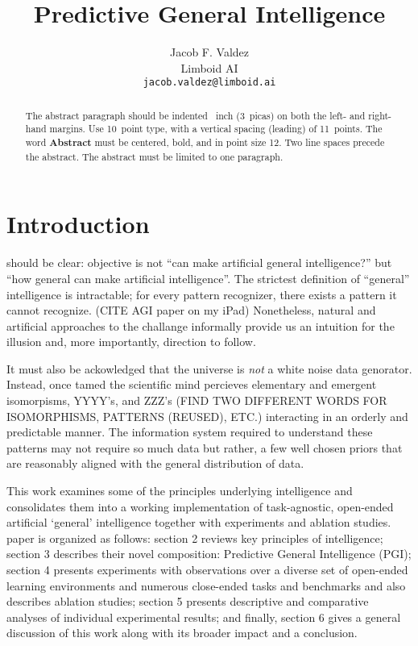\documentclass{article}
\title{Predictive General Intelligence}
\author{%
  Jacob F. Valdez \\
  Limboid AI \\
  \texttt{jacob.valdez@limboid.ai}
}
\begin{document}
\maketitle

\begin{abstract}
  The abstract paragraph should be indented ~inch (3~picas) on
  both the left- and right-hand margins. Use 10~point type, with a vertical
  spacing (leading) of 11~points.  The word \textbf{Abstract} must be centered,
  bold, and in point size 12. Two line spaces precede the abstract. The abstract
  must be limited to one paragraph.
\end{abstract}

\section{Introduction}

\I should be clear: \my objective is not ``can \I make artificial general intelligence?'' but ``how general can \I make artificial intelligence''. The strictest definition of ``general'' intelligence is intractable; for every pattern recognizer, there exists a pattern it cannot recognize. (CITE AGI paper on my iPad) Nonetheless, natural and artificial approaches to the challange informally provide us an intuition for the illusion and, more importantly, direction to follow.

It must also be ackowledged that the universe is \textit{not} a white noise data genorator. Instead, once tamed the scientific mind percieves elementary and emergent isomorpisms, YYYY's, and ZZZ's (FIND TWO DIFFERENT WORDS FOR ISOMORPHISMS, PATTERNS (REUSED), ETC.) interacting in an orderly and predictable manner. The information system required to understand these patterns may not require so much data but rather, a few well chosen priors that are reasonably aligned with the general distribution of data.
    
This work examines some of the principles underlying intelligence and consolidates them into a working implementation of task-agnostic, open-ended artificial `general' intelligence together with experiments and ablation studies. \My paper is organized as follows: section 2 reviews key principles of intelligence; section 3 describes their novel composition: Predictive General Intelligence (PGI); section 4 presents experiments with observations over a diverse set of open-ended learning environments and numerous close-ended tasks and benchmarks and also describes ablation studies; section 5 presents descriptive and comparative analyses of individual experimental results; and finally, section 6 gives a general discussion of this work along with its broader impact and a conclusion.  
\end{document}
